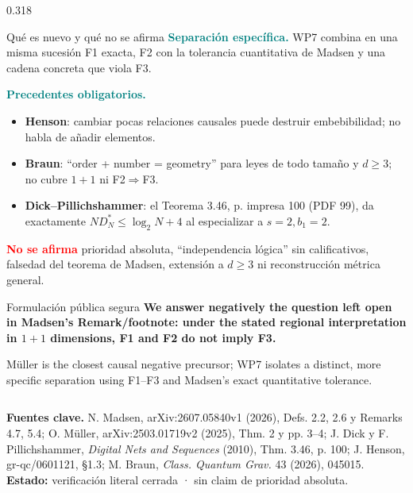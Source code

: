 \documentclass[final]{beamer}
\newcommand{\key}[1]{\textcolor{Teal}{\bfseries #1}}
\newcommand{\warn}[1]{\textcolor{Red}{\bfseries #1}}
\begin{document}
\begin{frame}[t]
\begin{columns}[T,totalwidth=\textwidth]
\begin{column}{0.318\textwidth}
\begin{posterbox}{Qué es nuevo y qué no se afirma}
  \key{Separación específica.} WP7 combina en una misma sucesión F1 exacta, F2 con la tolerancia
  cuantitativa de Madsen y una cadena concreta que viola F3.

  \vspace{4mm}
  \key{Precedentes obligatorios.}
  \begin{itemize}
    \setlength\itemsep{1.8mm}
    \item \textbf{Henson}: cambiar pocas relaciones causales puede destruir embebibilidad;
          no habla de añadir elementos.
    \item \textbf{Braun}: “order + number = geometry” para leyes de todo tamaño y \(d\ge3\);
          no cubre \(1+1\) ni F2\(\Rightarrow\)F3.
    \item \textbf{Dick--Pillichshammer}: el Teorema 3.46, p. impresa 100 (PDF 99), da exactamente
          \(ND_N^*\le\log_2N+4\) al especializar a \(s=2,b_1=2\).
  \end{itemize}

  \vspace{3mm}
  \warn{No se afirma} prioridad absoluta, “independencia lógica” sin calificativos, falsedad del
  teorema de Madsen, extensión a \(d\ge3\) ni reconstrucción métrica general.
\end{posterbox}

\begin{posterbox}[colback=Navy,colframe=Navy,coltitle=White]{Formulación pública segura}
  \color{White}
  \textbf{We answer negatively the question left open in Madsen's Remark/footnote: under the
  stated regional interpretation in \(1+1\) dimensions, F1 and F2 do not imply F3.}

  \vspace{4mm}
  \color{TealLight}
  Müller is the closest causal negative precursor; WP7 isolates a distinct, more specific
  separation using F1--F3 and Madsen's exact quantitative tolerance.
\end{posterbox}

\end{column}
\end{columns}

\vfill

\begin{tcolorbox}[
  enhanced,colback=NavyTwo,colframe=NavyTwo,boxrule=0pt,arc=0mm,
  left=10mm,right=10mm,top=5mm,bottom=5mm,width=\textwidth
]
{\fontsize{14.5}{18}\selectfont\color{White}
\textbf{Fuentes clave.}
N. Madsen, arXiv:2607.05840v1 (2026), Defs. 2.2, 2.6 y Remarks 4.7, 5.4;
O. Müller, arXiv:2503.01719v2 (2025), Thm. 2 y pp. 3--4;
J. Dick y F. Pillichshammer, \emph{Digital Nets and Sequences} (2010), Thm. 3.46, p. 100;
J. Henson, gr-qc/0601121, §1.3;
M. Braun, \emph{Class. Quantum Grav.} 43 (2026), 045015.
\hfill
\textbf{Estado:} verificación literal cerrada · sin claim de prioridad absoluta.}
\end{tcolorbox}

\end{frame}
\end{document}
